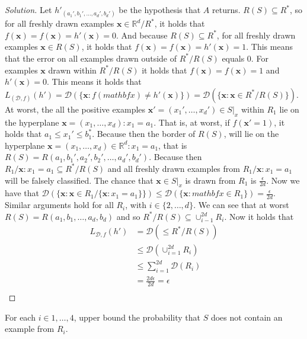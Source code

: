 \documentclass[10pt, a4paper, twoside]{amsart}
\newcommand{\R}{\ensuremath{\mathbb{R}}}
\newenvironment{solution}
               {\let\oldqedsymbol=\qedsymbol
                \renewcommand{\qedsymbol}{$\blacktriangleleft$}
                \begin{proof}[Solution]}
               {\end{proof}
                \renewcommand{\qedsymbol}{\oldqedsymbol}}
\begin{document}
\begin{solution}
    Let $h'_{(a_1',b_1',\ldots,a_d',b_d')}$ be the hypothesis that $A$ returns. $R(S)\subseteq R^*$, so for all freshly drawn examples $\mathbf{x} \in \R^d/R^*$,  it holds that $f(\mathbf{x})=f(\mathbf{x}) = h'(\mathbf{x}) = 0$. And because $R(S)\subseteq R^*$, for all freshly drawn examples $\mathbf{x} \in R(S)$, it holds that $f(\mathbf{x})=f(\mathbf{x}) = h'(\mathbf{x}) = 1$. This means that the error on all examples drawn outside of $R^*/R(S)$ equals $0$. For examples $\mathbf{x}$ drawn within $R^*/R(S)$ it holds that $f(\mathbf{x})=f(\mathbf{x}) = 1$ and $h'(\mathbf{x}) = 0$. This means it holds that $L_{(\mathcal{D},f)}(h') = \mathcal{D}(\{\mathbf{x}: f(mathbf{x}) \neq h'(\mathbf{x})\}) = \mathcal{D}(\{\mathbf{x}:\mathbf{x}\in R^*/R(S)\})$. \\
  At worst, the all the positive examples $\mathbf{x'} = (x_1',\ldots,x_d') \in S|_x$ within $R_1$ lie on the hyperplane $\mathbf{x}=(x_1,\ldots,x_d):x_1 = a_1$. That is, at worst, if $f(\mathbf{x'} = 1)$, it holds that $a_1\leq x_1' \leq b_1^*$. Because then the border of $R(S)$, will lie on the hyperplane $\mathbf{x} = (x_1,\ldots,x_d) \in \R^d: x_1 = a_1$, that is $R(S) = R(a_1,b_1',a_2',b_2',\ldots, a_d',b_d')$. Because then $R_{1}/{\mathbf{x}:x_1=a_1} \subseteq R^*/R(S)$ and all freshly drawn examples from $R_{1}/{\mathbf{x}:x_1=a_1}$ will be falsely classified. The chance that $\mathbf{x} \in S|_x$ is drawn from $R_1$ is $\frac{\epsilon}{2d}$. Now we have that $\mathcal{D}(\{\mathbf{x}: \mathbf{x} \in R_{1}/\{\mathbf{x}:x_1=a_1\}\}) \leq \mathcal{D}(\{\mathbf{x}: mathbf{x} \in R_{1}\}) = \frac{\epsilon}{2d}$.\\
  Similar arguments hold for all $R_i$, with $i \in \{2, \ldots ,d\}$. We can see that at worst $R(S) = R(a_1,b_1,\ldots,a_d,b_d)$ and so $R^*/R(S) \subseteq \cup_{i-1}^{2d} R_i$. Now it holds that
\begin{align*}
  L_{\mathcal{D},f}(h') & = \mathcal{D}(\leq R^*/R(S)) \\
                      & \leq \mathcal{D}(\cup_{i=1}^{2d} R_i) \\
                      & \leq \sum_{i=1}^{2d} \mathcal{D}(R_i)\\
 & = \frac{2d\epsilon}{2d} = \epsilon \\
\end{align*}
\end{solution}
For each $i \in {1,\ldots,4}$, upper bound the probability that $S$ does not contain an example from $R_i$.\\
\end{document}
